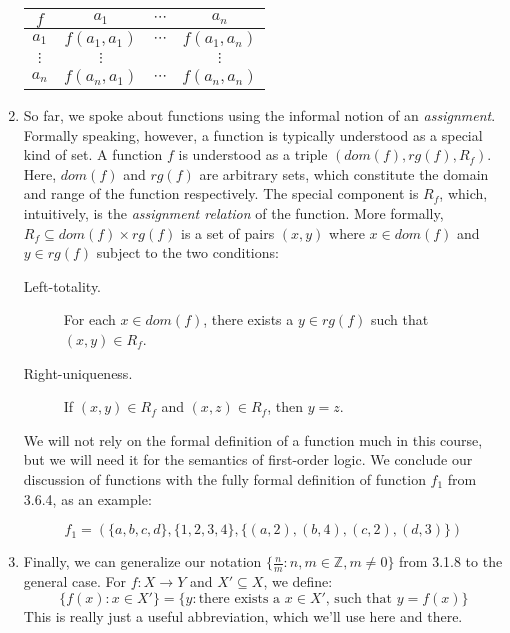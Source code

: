 \begin{enumerate}[\thesection.1]
\begin{center}
	\begin{tabular}{ c | c c c}
	$f$ & $a_1$ & $\cdots$ & $a_n$ \\ \hline
	
	$a_1$ &  $f(a_1, a_1)$ & $\cdots$ & $f(a_1, a_n)$\\
	
	$\vdots$ & $\vdots$ & & $\vdots$\\
	
	$a_n$ &  $f(a_n, a_1)$ & $\cdots$ & $f(a_n, a_n)$\\
	
	\end{tabular} 
	
\end{center}

	\item So far, we spoke about functions using the informal notion of an \emph{assignment}. Formally speaking, however, a function is typically understood as a special kind of set. A function $f$ is understood as a triple $(dom(f), rg(f), R_f)$. Here, $dom(f)$ and $rg(f)$ are arbitrary sets, which constitute the domain and range of the function respectively. The special component is $R_f$, which, intuitively, is the \emph{assignment relation} of the function. More formally, $R_f\subseteq dom(f)\times rg(f)$ is a set of pairs $(x,y)$ where $x\in dom(f)$ and $y\in rg(f)$ subject to the two conditions:
	\begin{description}
	
		\item[Left-totality.] For each $x\in dom(f)$, there exists a $y\in rg(f)$ such that $(x,y)\in R_f$.
	
		\item[Right-uniqueness.] If $(x,y)\in R_f$ and $(x,z)\in R_f$, then $y=z$.
	
	\end{description}
	
	We will not rely on the formal definition of a function much in this course, but we will need it for the semantics of first-order logic. We conclude our discussion of functions with the fully formal definition of function $f_1$ from 3.6.4, as an example:
	
	\[f_1=(\{a,b,c,d\}, \{1,2,3,4\}, \{(a,2), (b,4), (c,2), (d,3)\})\]
	
	\item Finally, we can generalize our notation $\{\frac{n}{m}:n,m\in \mathbb{Z}, m\neq 0\}$ from 3.1.8 to the general case. For $f:X\to Y$ and $X'\subseteq X$, we define: \[\{f(x):x\in X'\}=\{y:\text{there exists a }x\in X'\text{, such that }y=f(x)\}\] This is really just a useful abbreviation, which we'll use here and there.
	 
\end{enumerate}

